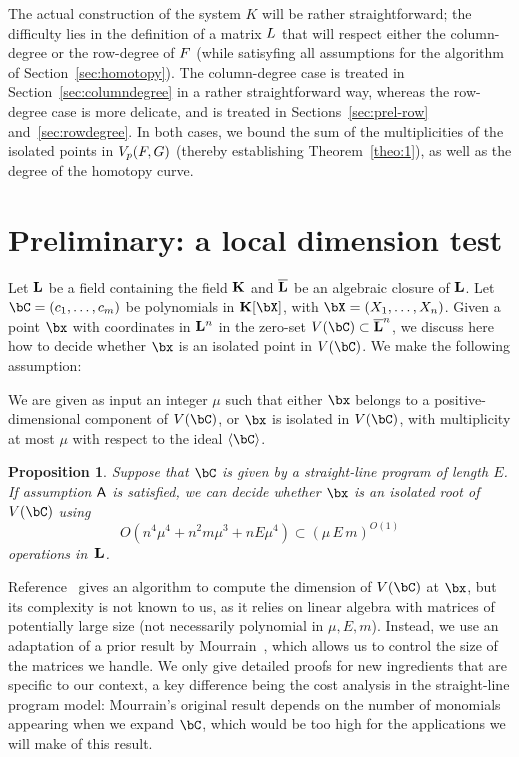 \documentclass[12pt]{article}
\newtheorem{proposition}[definition]{Proposition}
\begin{document}
The actual construction of the system $K$ will be rather
straightforward; the difficulty lies in the definition of a matrix
${L}$ that will respect either the column-degree or the row-degree of
${F}$ (while satisyfing all assumptions for the algorithm of
Section~\ref{sec:homotopy}).  The column-degree case is treated in
Section~\ref{sec:columndegree} in a rather straightforward way,
whereas the row-degree case is more delicate, and is treated in
Sections~\ref{sec:prel-row} and~\ref{sec:rowdegree}. In both cases, we
bound the sum of the multiplicities of the isolated points in $V_{p}({F},G)$ (thereby establishing Theorem~\ref{theo:1}), as well as the
degree of the homotopy curve.





\section{Preliminary: a local dimension test} \label{sec:isolated}

Let $\mathbf{L}$ be a field containing the field $\mathbf{K}$ and $\overline{\mathbf{L}}$ be an
algebraic closure of $\mathbf{L}$.  Let $\bC=(c_1,\dots,c_m)$ be polynomials
in $\KK[\bX]$, with $\bX=(X_1,\dots,X_n)$. Given a point $\bx$ with
coordinates in $\mathbf{L}^n$ in the zero-set $V(\bC)\subset \LLbar^n$, we
discuss here how to decide whether $\bx$ is an isolated point in
$V(\bC)$. We make the following assumption:
\begin{description}[leftmargin=*]
\item [$\assH.$] We are given as input an integer $\mu$ such that
 either $\bx$ belongs to a positive-dimensional component of $V(\bC)$,
 or $\bx$ is isolated in $V(\bC)$, with multiplicity at most $\mu$
  with respect to the ideal $\langle \bC\rangle$.
\end{description}

\begin{proposition}\label{prop:testisolated}
  Suppose that $\bC$ is given by a straight-line program of length $E$.
  If assumption $\mathsf{A}$ is satisfied, we can decide whether $\bx$ is an
  isolated root of $V(\bC)$ using 
$$O(n^4 \mu^4 + n^2 m \mu^3 + n E \mu^4) \subset (\mu\,E\,m)^{O(1)}$$ operations in~$\mathbf{L}$.
\end{proposition}
Reference~\cite{BaHaPeSo09} gives an algorithm to compute the
dimension of $V(\bC)$ at $\bx$, but its complexity is not known to us,
as it relies on linear algebra with matrices of potentially large size
(not necessarily polynomial in $\mu,E,m$).  Instead, we use an
adaptation of a prior result by Mourrain~\cite{Mourrain97}, which
allows us to control the size of the matrices we handle. We only give
detailed proofs for new ingredients that are specific to our context,
a key difference being the cost analysis in the straight-line program
model: Mourrain's original result depends on the number of monomials
appearing when we expand $\bC$, which would be too high for the
applications we will make of this result.
\end{document}
